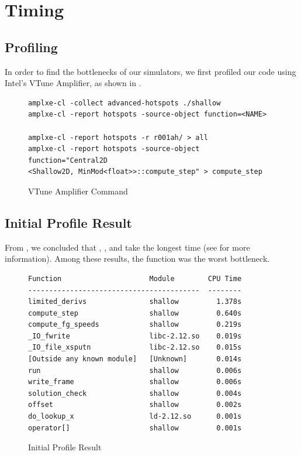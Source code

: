 \section{Timing}\label{sec:timing}
\subsection{Profiling}
In order to find the bottlenecks of our simulators, we first profiled our code
using Intel's VTune Amplifier, as shown in .

\begin{figure}[h]
\footnotesize
\begin{verbatim}
amplxe-cl -collect advanced-hotspots ./shallow
amplxe-cl -report hotspots -source-object function=<NAME>

amplxe-cl -report hotspots -r r001ah/ > all
amplxe-cl -report hotspots -source-object function="Central2D
<Shallow2D, MinMod<float>>::compute_step" > compute_step
\end{verbatim}
\caption{VTune Amplifier Command}
\label{fig:amplxe-command}
\end{figure}

\subsection{Initial Profile Result}

From , we concluded that ,
, and  take the longest time (see
 for more information). Among these results, the
 function was the worst bottleneck.

\begin{figure}[h]
\footnotesize
\begin{verbatim}
Function                     Module        CPU Time
-----------------------------------------  --------
limited_derivs               shallow         1.378s
compute_step                 shallow         0.640s
compute_fg_speeds            shallow         0.219s
_IO_fwrite                   libc-2.12.so    0.019s
_IO_file_xsputn              libc-2.12.so    0.015s
[Outside any known module]   [Unknown]       0.014s
run                          shallow         0.006s
write_frame                  shallow         0.006s
solution_check               shallow         0.004s
offset                       shallow         0.002s
do_lookup_x                  ld-2.12.so      0.001s
operator[]                   shallow         0.001s
\end{verbatim}
\caption{Initial Profile Result}
\label{fig:initial-profile-result}
\end{figure}

